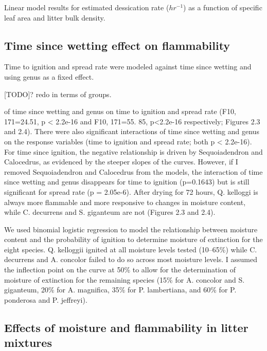 \documentclass[fire,article,submit,moreauthors,pdftex]{Definitions/mdpi}
\begin{document}
\begin{table}[H]
  \caption{Linear model results for estimated dessication rate ($hr^{-1}$) as a function of specific leaf area and litter bulk density.}
  \label{tab2-di-anova}
\centering

\end{table}


\subsection{Time since wetting effect on flammability}


Time to ignition and spread rate were modeled against time since wetting and using genus as a fixed effect.


[TODO]?  redo in terms of groups.

of time since wetting and genus on time to ignition and spread rate (F10, 171=24.51, p < 2.2e-16 and F10, 171=55. 85, p<2.2e-16 respectively; Figures 2.3 and 2.4). There were also significant interactions of time since wetting and genus on the response variables (time to ignition and spread rate; both p < 2.2e-16). For time since ignition, the negative relationship is driven by Sequoiadendron and Calocedrus, as evidenced by the steeper slopes of the curves. However, if I removed Sequoiadendron and Calocedrus from the models, the interaction of time since wetting and genus disappears for time to ignition (p=0.1643) but is still significant for spread rate (p = 2.05e-6). After drying for 72 hours, Q. kelloggi is always more flammable and more responsive to changes in moisture content, while C. decurrens and S. giganteum are not (Figures 2.3 and 2.4).


We used binomial logistic regression to model the relationship between moisture content and the probability of ignition to determine moisture of extinction for the eight species. Q. kelloggii ignited at all moisture levels tested (10--65\%) while C. decurrens and A. concolor failed to do so across most moisture levels. I assumed the inflection point on the curve at 50\% to allow for the determination of moisture of extinction for the remaining species (15\% for A. concolor and S. giganteum, 20\% for A. magnifica, 35\% for P. lambertiana, and 60\% for P. ponderosa and P. jeffreyi).

\subsection{Effects of moisture and flammability in litter mixtures}
\end{document}
